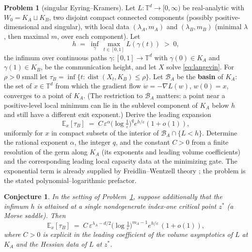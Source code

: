 \documentclass[11pt]{amsart}
\theoremstyle{plain}
\newtheorem{conjecture}[theorem]{Conjecture}
\theoremstyle{definition}
\newtheorem{problem}[theorem]{Problem}
\newcommand{\E}{\mathbb{E}}
\newcommand{\T}{\mathbb{T}}
\newcommand{\dist}{\operatorname{dist}}
\begin{document}
\begin{problem}[singular Eyring--Kramers]\label{prob:kramers}
Let $L\colon \T^d \to [0,\infty)$ be real-analytic with $W_0 = K_A \sqcup K_B$, two disjoint compact connected components (possibly positive-dimensional and singular), with local data $(\lambda_A, m_A)$ and $(\lambda_B, m_B)$ (minimal $\lambda$, then maximal $m$, over each component). Let
\[
   h \;=\; \inf_{\gamma} \, \max_{t \in [0,1]} L(\gamma(t)) \;>\; 0,
\]
the infimum over continuous paths $\gamma\colon [0,1] \to \T^d$ with $\gamma(0) \in K_A$ and $\gamma(1) \in K_B$, be the communication height, and let $X$ solve \eqref{eq:langevin}. For $\rho > 0$ small let $\tau_B = \inf \{ t : \dist(X_t, K_B) \le \rho \}$. Let $\mathcal{B}_A$ be the \textbf{basin} of $K_A$: the set of $x \in \T^d$ from which the gradient flow $\dot w = -\nabla L(w)$, $w(0) = x$, converges to a point of $K_A$. (The restriction to $\mathcal B_A$ matters: a point near a positive-level local minimum can lie in the sublevel component of $K_A$ below $h$ and still have a different exit exponent.) Derive the leading expansion
\[
   \E_x[\tau_B]
   \;=\;
   C\,\varepsilon^\alpha
   \bigl(\log\tfrac1\varepsilon\bigr)^q
   e^{h/\varepsilon}(1+o(1)),
\]
uniformly for $x$ in compact subsets of the interior of $\mathcal{B}_A \cap \{ L < h \}$. Determine the rational exponent $\alpha$, the integer $q$, and the constant $C>0$ from a finite resolution of the germ along $K_A$ (its exponents and leading volume coefficients) and the corresponding leading local capacity data at the minimizing gate. The exponential term is already supplied by Freidlin--Wentzell theory \cite{freidlin2012}; the problem is the stated polynomial--logarithmic prefactor.
\end{problem}

\begin{conjecture}\label{conj:kramers}
In the setting of Problem~\ref{prob:kramers}, suppose additionally that the infimum $h$ is attained at a single nondegenerate index-one critical point $z^*$ (a Morse saddle). Then
\[
   \E_x[\tau_B] \;=\; C\, \varepsilon^{\lambda_A - d/2} \bigl( \log \tfrac1\varepsilon \bigr)^{m_A - 1} e^{h/\varepsilon} \, (1 + o(1)),
\]
where $C > 0$ is explicit in the leading coefficient of the volume asymptotics of $L$ at $K_A$ and the Hessian data of $L$ at $z^*$.
\end{conjecture}
\end{document}

